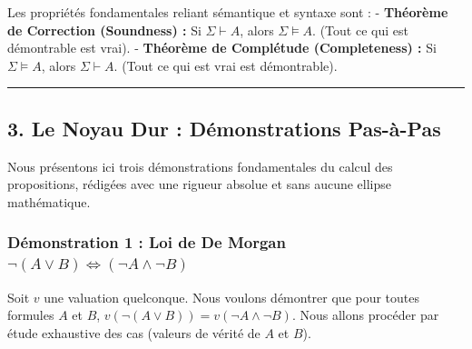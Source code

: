 \documentclass[11pt,a4paper]{article}
\begin{document}
Les propriétés fondamentales reliant sémantique et syntaxe sont : -
\textbf{Théorème de Correction (Soundness) :} Si \(\Sigma \vdash A\),
alors \(\Sigma \models A\). (Tout ce qui est démontrable est vrai). -
\textbf{Théorème de Complétude (Completeness) :} Si
\(\Sigma \models A\), alors \(\Sigma \vdash A\). (Tout ce qui est vrai
est démontrable).

\begin{center}\rule{0.5\linewidth}{0.5pt}\end{center}

\hypertarget{le-noyau-dur-duxe9monstrations-pas-uxe0-pas}{%
\subsection{3. Le Noyau Dur : Démonstrations
Pas-à-Pas}\label{le-noyau-dur-duxe9monstrations-pas-uxe0-pas}}

Nous présentons ici trois démonstrations fondamentales du calcul des
propositions, rédigées avec une rigueur absolue et sans aucune ellipse
mathématique.

\hypertarget{duxe9monstration-1-loi-de-de-morgan-nega-lor-b-leftrightarrow-neg-a-land-neg-b}{%
\subsubsection{\texorpdfstring{Démonstration 1 : Loi de De Morgan
\(\neg(A \lor B) \Leftrightarrow (\neg A \land \neg B)\)}{Démonstration 1 : Loi de De Morgan \textbackslash neg(A \textbackslash lor B) \textbackslash Leftrightarrow (\textbackslash neg A \textbackslash land \textbackslash neg B)}}\label{duxe9monstration-1-loi-de-de-morgan-nega-lor-b-leftrightarrow-neg-a-land-neg-b}}

Soit \(v\) une valuation quelconque. Nous voulons démontrer que pour
toutes formules \(A\) et \(B\),
\(v(\neg(A \lor B)) = v(\neg A \land \neg B)\). Nous allons procéder par
étude exhaustive des cas (valeurs de vérité de \(A\) et \(B\)).
\end{document}

